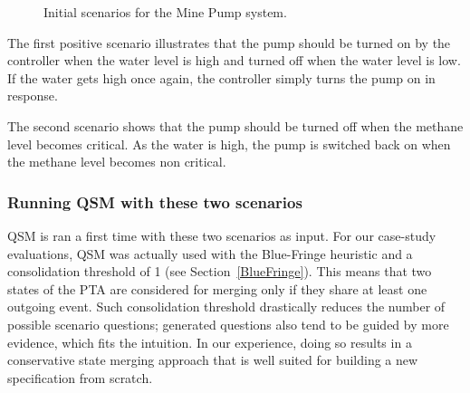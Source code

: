 \begin{figure}
\centering
{}
\caption{Initial scenarios for the Mine Pump system\label{image:minepump-initial-scenarios}.}
\end{figure}

The first positive scenario illustrates that the pump should be turned on by the controller when the water level is high and turned off when the water level is low. If the water gets high once again, the controller simply turns the pump on in response. 

The second scenario shows that the pump should be turned off when the methane level becomes critical. As the water is high, the pump is switched back on when the methane level becomes non critical.

\subsubsection*{Running QSM with these two scenarios}

QSM is ran a first time with these two scenarios as input. For our case-study evaluations, QSM was actually used with the Blue-Fringe heuristic and a consolidation threshold of 1 (see Section~\ref{BlueFringe}). This means that two states of the PTA are considered for merging only if they share at least one outgoing event. Such consolidation threshold drastically reduces the number of possible scenario questions; generated questions also tend to be guided by more evidence, which fits the intuition. In our experience, doing so results in a conservative state merging approach that is well suited for building a new specification from scratch.

